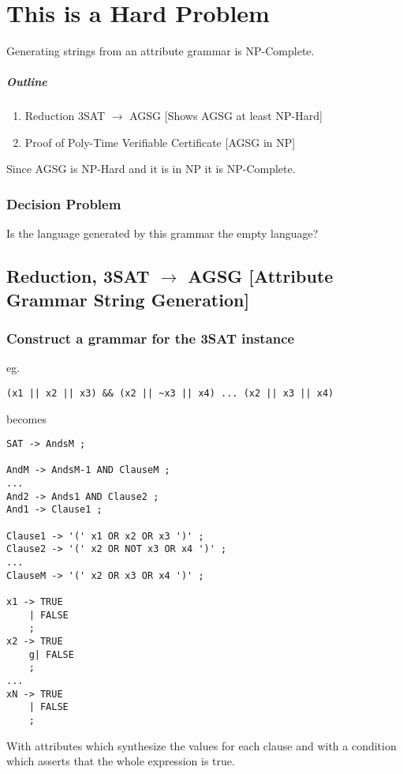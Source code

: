 
\section{This is a Hard Problem}
\label{hard}

Generating strings from an attribute grammar is NP-Complete.

\subparagraph{Outline}

\begin{enumerate}[1.]
\item
  Reduction 3SAT $\rightarrow$ AGSG {[}Shows AGSG at least NP-Hard{]}
\item
  Proof of Poly-Time Verifiable Certificate {[}AGSG in NP{]}
\end{enumerate}
Since AGSG is NP-Hard and it is in NP it is NP-Complete.

\subsubsection{Decision Problem}

Is the language generated by this grammar the empty language?

\subsection{Reduction, 3SAT $\rightarrow$ AGSG {[}Attribute Grammar
String Generation{]}}

\subsubsection{Construct a grammar for the 3SAT instance}

eg.

\begin{verbatim}
(x1 || x2 || x3) && (x2 || ~x3 || x4) ... (x2 || x3 || x4)
\end{verbatim}
becomes

\begin{verbatim}
SAT -> AndsM ;

AndM -> AndsM-1 AND ClauseM ;
...
And2 -> Ands1 AND Clause2 ;
And1 -> Clause1 ;

Clause1 -> '(' x1 OR x2 OR x3 ')' ;
Clause2 -> '(' x2 OR NOT x3 OR x4 ')' ;
...
ClauseM -> '(' x2 OR x3 OR x4 ')' ;

x1 -> TRUE
    | FALSE
    ;
x2 -> TRUE
    g| FALSE
    ;
...
xN -> TRUE
    | FALSE
    ;
\end{verbatim}
With attributes which synthesize the values for each clause and with a
condition which asserts that the whole expression is true.

